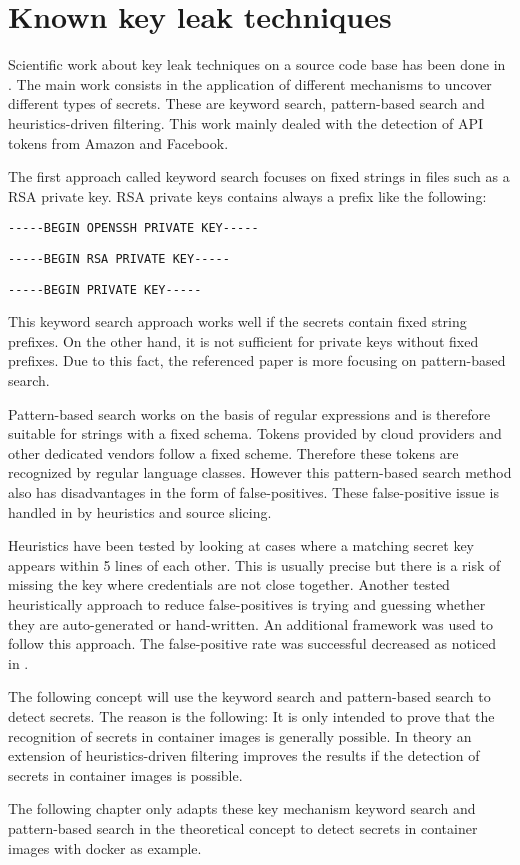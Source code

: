 %
%

\chapter{Known key leak techniques}
\label{ch:known_key_leak_techniques}
Scientific work about key leak techniques on a source code base has been done in \cite{7180102}. 
The main work consists in the application of different mechanisms to uncover different types of secrets.
These are keyword search, pattern-based search and heuristics-driven filtering.
This work mainly dealed with the detection of API tokens from Amazon and Facebook.
	
The first approach called keyword search focuses on fixed strings in files such as a RSA private key. RSA private keys contains always a prefix like the following:
\begin{lstlisting}
-----BEGIN OPENSSH PRIVATE KEY-----
\end{lstlisting}
\begin{lstlisting}
-----BEGIN RSA PRIVATE KEY-----
\end{lstlisting}
\begin{lstlisting}
-----BEGIN PRIVATE KEY-----
\end{lstlisting}
This keyword search approach works well if the secrets contain fixed string prefixes. 
On the other hand, it is not sufficient for private keys without fixed prefixes.
Due to this fact, the referenced paper \cite{7180102} is more focusing on pattern-based search. 

Pattern-based search works on the basis of regular expressions and is therefore suitable for strings with a fixed schema.
Tokens provided by cloud providers and other dedicated vendors follow a fixed scheme. Therefore these tokens are recognized by regular language classes.
However this pattern-based search method also has disadvantages in the form of false-positives.
These false-positive issue is handled in \cite{7180102} by heuristics and source slicing.

Heuristics have been tested by looking at cases where a matching secret key appears within 5 lines of each other. This is usually precise but there is a risk of missing the key where credentials are not close together.
Another tested heuristically approach to reduce false-positives is trying and guessing whether they are auto-generated or hand-written. 
An additional framework was used to follow this approach. The false-positive rate was successful decreased as noticed in \cite{7180102}.

The following concept will use the keyword search and pattern-based search to detect secrets. 
The reason is the following: It is only intended to prove that the recognition of secrets in container images is generally possible. 
In theory an extension of heuristics-driven filtering improves the results if the detection of secrets in container images is possible.

The following chapter only adapts these key mechanism keyword search and pattern-based search in the theoretical concept to detect secrets in container images with docker as example.